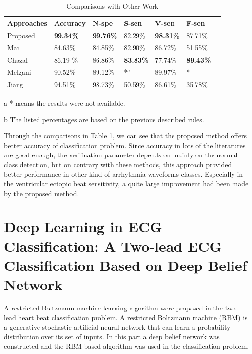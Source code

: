 \documentclass{bmcart}
\begin{document}
\begin{table}[!htbp]
\begin{center}
\begin{threeparttable}
\caption{Comparisons with Other Work}
\label{table9}
\begin{tabular}{lllllll}
\hline

Approaches            &  Accuracy & N-spe & S-sen & V-sen & F-sen \\
\hline
 Proposed             & \textbf{99.34\%}  & \textbf{99.76\%} &  82.29\% & \textbf{98.31\%} & 87.71\% \\
 Mar\cite{mar}        & 84.63\%  & 84.85\% & 82.90\%  & 86.72\% & 51.55\% \\
 Chazal\cite{chaza}   & 86.19 \% & 86.86\% & \textbf{83.83\%}  & 77.74\% & \textbf{89.43\%} \\
 Melgani\cite{melgan} & 90.52\%  & 89.12\% & *$^a$    & 89.97\% & * \\
 Jiang \cite{jiang}   & 94.51\%  & 98.73\% & 50.59\%  & 86.61\% & 35.78\% \\
\hline
\end{tabular}
\begin{tablenotes}
\item [a] * means the results were not available.
\item [b] The listed percentages are based on the previous described rules.
\end{tablenotes}
\end{threeparttable}
\end{center}
\end{table}

Through the comparisons in Table \ref{table9}, we can see that the proposed method offers better accuracy of classification problem. Since accuracy in lots of the literatures are good enough, the verification parameter depends on mainly on the normal class detection, but on contrary with these methods, this approach provided better performance in other kind of arrhythmia waveforms classes. Especially in the ventricular ectopic beat sensitivity, a quite large improvement had been made by the proposed method.


\section*{Deep Learning in ECG Classification: A Two-lead ECG Classification Based on Deep Belief Network}
A restricted Boltzmann machine learning algorithm were proposed in the two-lead heart beat classification problem. A restricted Boltzmann machine (RBM) is a generative stochastic artificial neural network that can learn a probability distribution over its set of inputs. In this part a deep belief network was constructed and the RBM based algorithm was used in the classification problem. 
\end{document}
